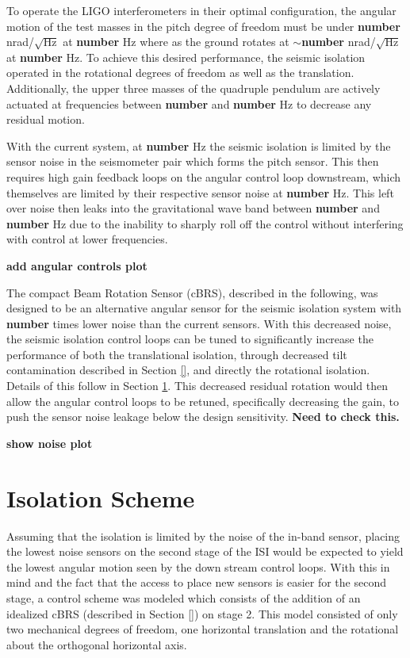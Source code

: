 \documentclass [12pt, proquest]{uwthesis}[2019]
\begin{document}
To operate the LIGO interferometers in their optimal configuration, the angular motion of the test masses in the pitch degree of freedom must be under \textbf{number} nrad/$\sqrt{\text{Hz}}$ at \textbf{number} Hz where as the ground rotates at $\sim$\textbf{number} nrad/$\sqrt{\text{Hz}}$ at \textbf{number} Hz. To achieve this desired performance, the seismic isolation operated in the rotational degrees of freedom as well as the translation. Additionally, the upper three masses of the quadruple pendulum are actively actuated at frequencies between \textbf{number} and \textbf{number} Hz to decrease any residual motion.

With the current system, at \textbf{number} Hz the seismic isolation is limited by the sensor noise in the seismometer pair which forms the pitch sensor. This then requires high gain feedback loops on the angular control loop downstream, which themselves are limited by their respective sensor noise at \textbf{number} Hz. This left over noise then leaks into the gravitational wave band between \textbf{number} and \textbf{number} Hz due to the inability to sharply roll off the control without interfering with control at lower frequencies.

\textbf{add angular controls plot}

The compact Beam Rotation Sensor (cBRS), described in the following, was designed to be an alternative angular sensor for the seismic isolation system with \textbf{number} times lower noise than the current sensors. With this decreased noise, the seismic isolation control loops can be tuned to significantly increase the performance of both the translational isolation, through decreased tilt contamination described in Section \ref{}, and directly the rotational isolation. Details of this follow in Section \ref{IsoScheme}. This decreased residual rotation would then allow the angular control loops to be retuned, specifically decreasing the gain, to push the sensor noise leakage below the design sensitivity. \textbf{Need to check this.}

\textbf{show noise plot}

\section{Isolation Scheme} \label{IsoScheme}

Assuming that the isolation is limited by the noise of the in-band sensor, placing the lowest noise sensors on the second stage of the ISI would be expected to yield the lowest angular motion seen by the down stream control loops. With this in mind and the fact that the access to place new sensors is easier for the second stage, a control scheme was modeled which consists of the addition of an idealized cBRS (described in Section \ref{}) on stage 2. This model consisted of only two mechanical degrees of freedom, one horizontal translation and the rotational about the orthogonal horizontal axis.
\end{document}
